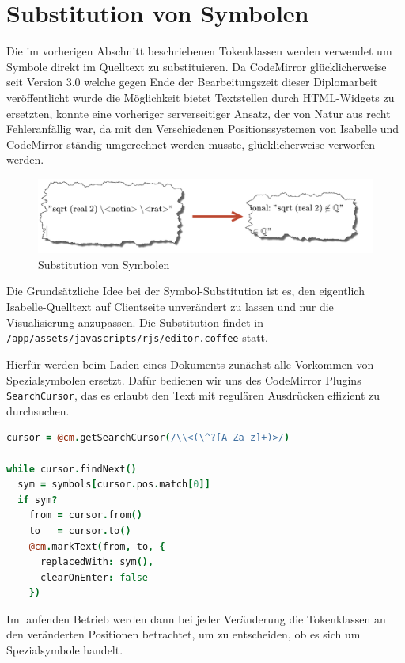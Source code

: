 \section{Substitution von Symbolen}

Die im vorherigen Abschnitt beschriebenen Tokenklassen werden verwendet um Symbole direkt im
Quelltext zu substituieren. Da CodeMirror glücklicherweise seit Version 3.0 welche gegen Ende der
Bearbeitungszeit dieser Diplomarbeit veröffentlicht wurde die Möglichkeit bietet Textstellen durch
HTML-Widgets zu ersetzten, konnte eine vorheriger serverseitiger Ansatz, der von Natur aus recht
Fehleranfällig war, da mit den Verschiedenen Positionssystemen von Isabelle und CodeMirror ständig
umgerechnet werden musste, glücklicherweise verworfen werden.

\begin{figure}[ht]
\includegraphics[width=\linewidth]{images/subst}
  \caption{Substitution von Symbolen}
  \label{fig:subst}
\end{figure}

Die Grundsätzliche Idee bei der Symbol-Substitution ist es, den eigentlich Isabelle-Quelltext auf
Clientseite unverändert zu lassen und nur die Visualisierung anzupassen. Die Substitution findet in
\texttt{/app/assets/javascripts/rjs/editor.coffee} statt.

Hierfür werden beim Laden eines Dokuments zunächst alle Vorkommen von Spezialsymbolen ersetzt. Dafür
bedienen wir uns des CodeMirror Plugins \texttt{SearchCursor}, das es erlaubt den Text mit regulären
Ausdrücken effizient zu durchsuchen.

\begin{lstlisting}[language=coffee]
cursor = @cm.getSearchCursor(/\\<(\^?[A-Za-z]+)>/)

while cursor.findNext()
  sym = symbols[cursor.pos.match[0]]
  if sym?
    from = cursor.from()
    to   = cursor.to()
    @cm.markText(from, to, {
      replacedWith: sym(),
      clearOnEnter: false
    })
\end{lstlisting}

Im laufenden Betrieb werden dann bei jeder Veränderung die Tokenklassen an den veränderten
Positionen betrachtet, um zu entscheiden, ob es sich um Spezialsymbole handelt.

